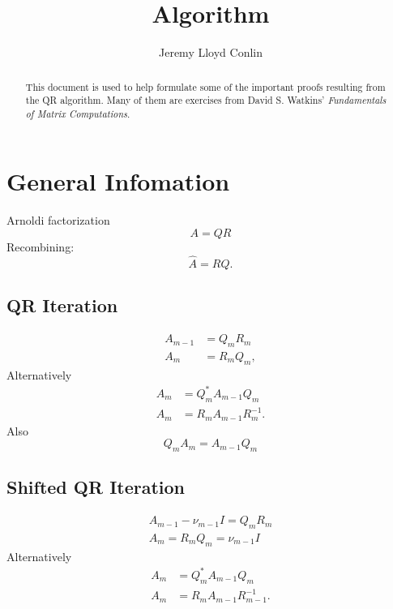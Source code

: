 \documentclass[10pt,letterpaper]{article}
\title{\QR Algorithm}
\author{Jeremy Lloyd Conlin}
\newcommand{\QR}{\ensuremath{QR} }
\begin{document}
\maketitle
\begin{abstract}
    This document is used to help formulate some of the important proofs resulting from the QR algorithm.  Many of them are exercises from David S. Watkins' \emph{Fundamentals of Matrix Computations}.
\end{abstract}

\section{General Infomation}
Arnoldi factorization
\begin{equation}
    A = \QR
    \label{eq:QRFactorization}
\end{equation}
Recombining:
\begin{equation}
    \hat{A} = RQ.
\end{equation}

\subsection{QR Iteration}
\begin{subequations}\begin{align}
    A_{m-1} &= Q_mR_m \\
    A_{m} &= R_mQ_m,
\end{align}
    \label{eq:QRIteration}
\end{subequations}
Alternatively
\begin{subequations}\begin{align}
    A_{m} &= Q_m^*A_{m-1}Q_m \\
    A_{m} &= R_mA_{m-1}R_m^{-1}.
\end{align}
    \label{eq:QRIterationAlternate}
\end{subequations}
Also
\begin{equation}
    Q_mA_m = A_{m-1}Q_m
\end{equation}

\subsection{Shifted QR Iteration}
\begin{subequations}\begin{gather}
    A_{m-1} - \nu_{m-1} I = Q_mR_m \label{eq:ShiftedQRFactorization} \\
    A_m = R_mQ_m = \nu_{m-1}I
\end{gather}
    \label{eq:ShiftedQRIteration}
\end{subequations}
Alternatively
\begin{subequations}\begin{align}
    A_m &= Q_m^*A_{m-1}Q_m \\
    A_m &= R_mA_{m-1}R_{m-1}^{-1}.
\end{align}
    \label{eq:ShifteDQRIterationAlternative}
\end{subequations}
\end{document}
